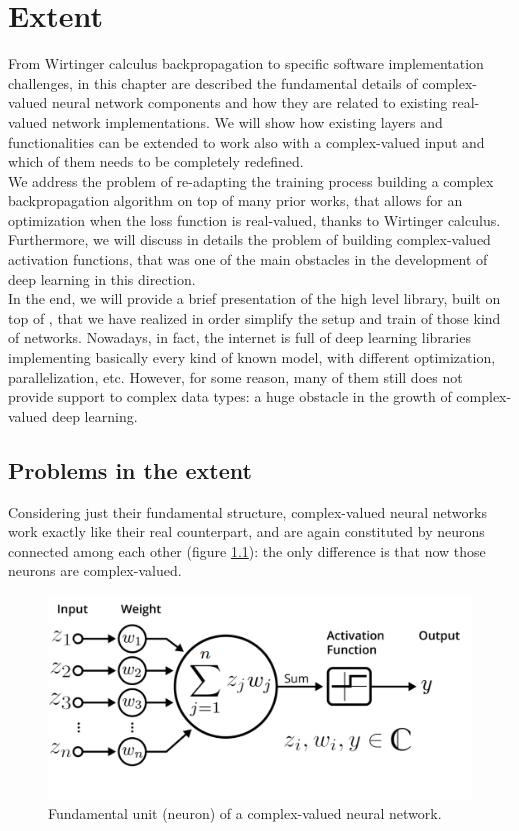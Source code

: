 \documentclass[../main.tex]{subfiles}
\begin{document}
	
\chapter{Extent}
From Wirtinger calculus backpropagation to specific software implementation challenges, in this chapter are described the fundamental details of
complex-valued neural network components and how they are related to existing real-valued network implementations. We will show how existing layers and functionalities can be extended to work also with a complex-valued input and which of them needs to be completely redefined.\\
We address the problem of re-adapting the training process building a complex backpropagation algorithm on top of many prior works, that allows for an optimization when the loss function is real-valued, thanks to Wirtinger calculus.\\
Furthermore, we will discuss in details the problem of building complex-valued activation functions, that was one of the main obstacles in the development of deep learning in this direction.\\
In the end, we will provide a brief presentation of the high level library, built on top of \JAX, that we have realized in order simplify the setup and train of those kind of networks. Nowadays, in fact, the internet is full of deep learning libraries implementing basically every kind of known model, with different optimization, parallelization, etc. However, for some reason, many of them still does not provide support to complex data types: a huge obstacle in the growth of complex-valued deep learning.


\section{Problems in the extent}
\label{sec:problems_extent}

Considering just their fundamental structure, complex-valued neural networks work exactly like their real counterpart, and are again constituted by neurons connected among each other (figure \ref{fig:cmplx_neuron}): the only difference is that now those neurons are complex-valued. 

\begin{figure}[!ht]
	\centering
	\includegraphics[scale=0.25]{pictures/complex_neuron}
	\caption{Fundamental unit (neuron) of a complex-valued neural network.}
	\label{fig:cmplx_neuron}
\end{figure}
\end{document}
